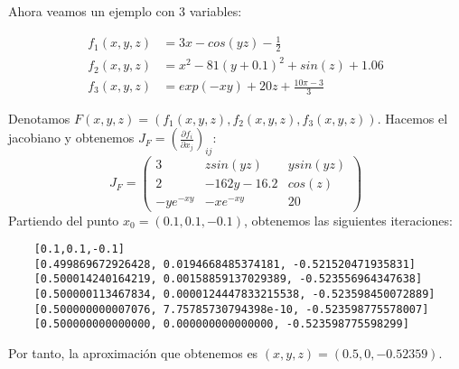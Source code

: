 \begin{example}

Ahora veamos un ejemplo con 3 variables:

\begin{align*}
	f_1(x,y,z) &= 3x - cos(yz) - \frac{1}{2} \\
	f_2(x,y,z) &= x^2 - 81(y+0.1)^2 + sin(z) + 1.06\\
	f_3(x,y,z) &= exp(-xy) + 20z + \frac{10\pi-3}{3}
\end{align*}

Denotamos $F(x,y,z) = (f_1(x,y,z),f_2(x,y,z),f_3(x,y,z))$. Hacemos el jacobiano y obtenemos $ J_F =(\frac{\partial f_i}{\partial x_j})_{ij}$:
$$
	J_F = 
	\begin{pmatrix}
	3 & z sin(yz) & y sin(yz) \\
	2 & -162y-16.2 & cos(z) \\
	-ye^{-xy} & -xe^{-xy} & 20
	\end{pmatrix}
$$
Partiendo del punto $x_0 = (0.1,0.1,-0.1)$, obtenemos las siguientes iteraciones:
\begin{verbatim}
	[0.1,0.1,-0.1]
	[0.499869672926428, 0.0194668485374181, -0.521520471935831]
	[0.500014240164219, 0.00158859137029389, -0.523556964347638]
	[0.500000113467834, 0.0000124447833215538, -0.523598450072889]
	[0.500000000007076, 7.75785730794398e-10, -0.523598775578007]
	[0.500000000000000, 0.000000000000000, -0.523598775598299]
\end{verbatim}


Por tanto, la aproximación que obtenemos es $(x,y,z) = (0.5, 0, -0.52359)$.
	
%		
%		
%		
%		
%		
%		
%		
%		
%		
%		
%		
%		
%		
%		
%
	
\end{example}



